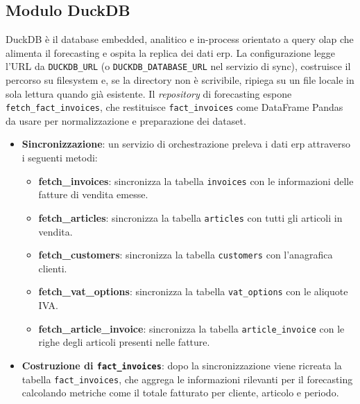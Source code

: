 \subsection{Modulo DuckDB}
DuckDB è il database embedded, analitico e in-process orientato a query \gls{olap} che alimenta il forecasting e ospita la replica dei dati \acrshort{erp}. La configurazione legge l’URL da \texttt{DUCKDB\_URL} (o \texttt{DUCKDB\_DATABASE\_URL} nel servizio di sync), costruisce il percorso su filesystem e, se la directory non è scrivibile, ripiega su un file locale in sola lettura quando già esistente. Il \textit{repository} di forecasting espone \texttt{fetch\_fact\_invoices}, che restituisce \texttt{fact\_invoices} come DataFrame Pandas da usare per normalizzazione e preparazione dei dataset.
\begin{itemize}
    \item \textbf{Sincronizzazione}: un servizio di orchestrazione preleva i dati \acrshort{erp} attraverso i seguenti metodi:
    \begin{itemize}
        \item \textbf{fetch\_invoices}: sincronizza la tabella \texttt{invoices} con le informazioni delle fatture di vendita emesse.
        \item \textbf{fetch\_articles}: sincronizza la tabella \texttt{articles} con tutti gli articoli in vendita.
        \item \textbf{fetch\_customers}: sincronizza la tabella \texttt{customers} con l’anagrafica clienti.
        \item \textbf{fetch\_vat\_options}: sincronizza la tabella \texttt{vat\_options} con le aliquote IVA.
        \item \textbf{fetch\_article\_invoice}: sincronizza la tabella \texttt{article\_invoice} con le righe degli articoli presenti nelle fatture.
    \end{itemize}
    \item \textbf{Costruzione di \texttt{fact\_invoices}}: dopo la sincronizzazione viene ricreata la tabella \texttt{fact\_invoices}, che aggrega le informazioni rilevanti per il forecasting calcolando metriche come il totale fatturato per cliente, articolo e periodo.
\end{itemize}

